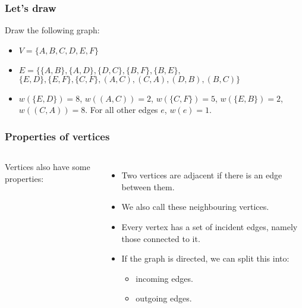 \begin{frame}
	\frametitle{Let's draw}

		Draw the following graph:
		\begin{itemize}
			\item $V = \{A,B,C,D,E,F\}$\\
			\item	$E = \{
			\{A, B\},
			\{A, D\},
			\{D, C\},
			\{B, F\},
			\{B, E\},$\\$
			\{E, D\},
			\{E, F\},
			\{C, F\},
			(A,C),
			(C,A),
			(D,B),
			(B,C)
		\}$\\
	\item $w(\{E,D\}) = 8$, $w((A,C)) = 2$, $w(\{C,F\}) = 5$, $w(\{E,B\}) = 2$, $w((C,A)) = 8$.
		For all other edges $e$, $w(e) = 1$.
		\end{itemize}
\end{frame}

\begin{frame}
	\frametitle{Properties of vertices}
		
	\begin{columns}[T]
			
		Vertices also have some properties:
		
		\begin{itemize}
			\item Two vertices are \alert{adjacent} if there is an edge between them.
			\item We also call these \alert{neighbouring} vertices.
				
			\item Every vertex has a set of \alert{incident} edges, namely those connected to it.
				
			\item If the graph is directed, we can split this into:
				\begin{itemize}
					\item \alert{incoming} edges.
						
					\item \alert{outgoing} edges.
				\end{itemize}
		\end{itemize}
	\end{columns}
\end{frame}


